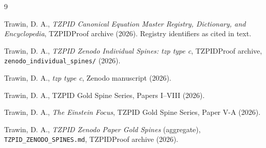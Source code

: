 \documentclass[11pt]{article}
\theoremstyle{remark}
\begin{document}
\begin{thebibliography}{9}

 Trawin, D. A., \emph{TZPID Canonical Equation Master Registry, Dictionary, and Encyclopedia}, TZPIDProof archive (2026). Registry identifiers as cited in text.

 Trawin, D. A., \emph{TZPID Zenodo Individual Spines: tzp type c}, TZPIDProof archive, \texttt{zenodo\_individual\_spines/} (2026).

 Trawin, D. A., \emph{tzp type c}, Zenodo manuscript (2026).

 Trawin, D. A., TZPID Gold Spine Series, Papers I--VIII (2026).

 Trawin, D. A., \emph{The Einstein Focus}, TZPID Gold Spine Series, Paper V-A (2026).

 Trawin, D. A., \emph{TZPID Zenodo Paper Gold Spines} (aggregate), \texttt{TZPID\_ZENODO\_SPINES.md}, TZPIDProof archive (2026).

\end{thebibliography}
\end{document}
